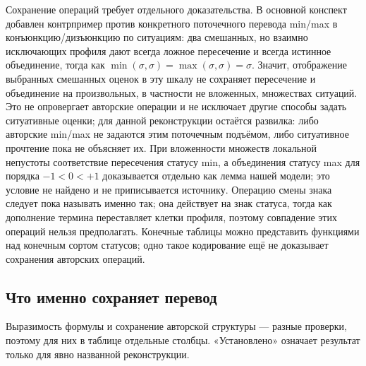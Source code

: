 \documentclass[12pt,a4paper]{article}
\begin{document}
Сохранение операций требует отдельного доказательства. В основной конспект добавлен контрпример против конкретного поточечного перевода min/max в конъюнкцию/дизъюнкцию по ситуациям: два смешанных, но взаимно исключающих профиля дают всегда ложное пересечение и всегда истинное объединение, тогда как \(\min(\sigma,\sigma)=\max(\sigma,\sigma)=\sigma\). Значит, отображение выбранных смешанных оценок в эту шкалу не сохраняет пересечение и объединение на произвольных, в частности не вложенных, множествах ситуаций. Это не опровергает авторские операции и не исключает другие способы задать ситуативные оценки; для данной реконструкции остаётся развилка: либо авторские min/max не задаются этим поточечным подъёмом, либо ситуативное прочтение пока не объясняет их. При вложенности множеств локальной непустоты соответствие пересечения статусу min, а объединения статусу max для порядка \(-1<0<+1\) доказывается отдельно как лемма нашей модели; это условие не найдено и не приписывается источнику. Операцию смены знака следует пока называть именно так; она действует на знак статуса, тогда как дополнение термина переставляет клетки профиля, поэтому совпадение этих операций нельзя предполагать. Конечные таблицы можно представить функциями над конечным сортом статусов; одно такое кодирование ещё не доказывает сохранения авторских операций.

\subsection*{Что именно сохраняет перевод}

Выразимость формулы и сохранение авторской структуры — разные проверки, поэтому для них в таблице отдельные столбцы. «Установлено» означает результат только для явно названной реконструкции.
\end{document}
